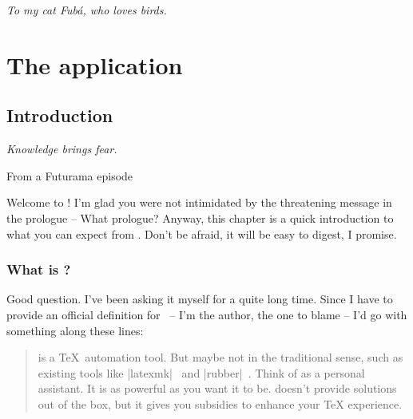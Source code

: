 \documentclass[a4paper,twoside,12pt]{memoir}
\begin{document}
\vspace*{25em}

\begin{flushright}
\em To my cat Fubá, who loves birds.
\end{flushright}

\cleardoublepage

\tableofcontents*

\cleardoublepage

\listoffigures*

\cleardoublepage

\listoftables*

\cleardoublepage

\listofcodes*

\mainmatter

\part{The application}

\chapter{Introduction}
\label{chap:intro}

\epigraph{\emph{Knowledge brings fear.}}{From a Futurama episode}

Welcome to \arara! I'm glad you were not intimidated by the threatening message
in the prologue -- What prologue? Anyway, this chapter is a quick introduction 
to what you can expect from \arara. Don't be afraid, it will be easy to digest,
I promise.

\section{What is \texorpdfstring{\arara}{arara}?}
\label{sec:whatisarara}

Good question. I've been asking it myself for a quite long time. Since I have to
provide an official definition for \arara \ -- I'm the author, the one to blame 
-- I'd go with something along these lines:

\begin{quotation}
\noindent\arara is a \TeX\ automation tool. But maybe not in the traditional 
sense, such as existing tools like |latexmk|~\cite{collins:2001} and 
|rubber|~\cite{rubber:2009}. Think of \arara as a personal assistant. It is as 
powerful as you want it to be. \arara doesn't provide solutions out of the box,
but it gives you subsidies to enhance your \TeX{} experience.
\end{quotation}
\end{document}
